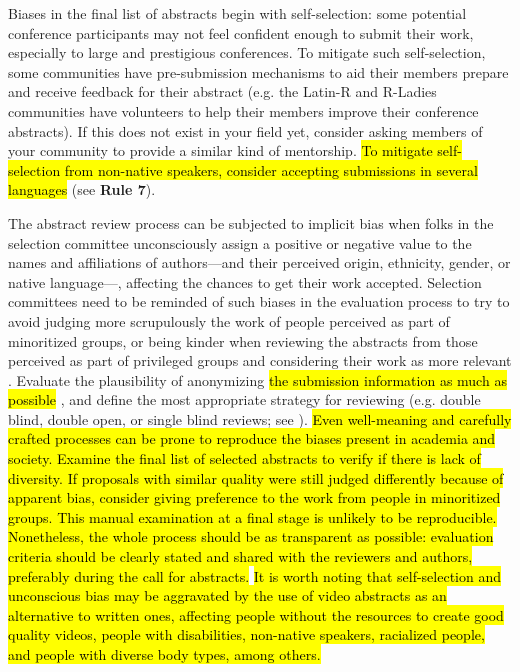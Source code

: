 \documentclass[10pt,letterpaper]{article}
\begin{document}
Biases in the final list of abstracts begin with self-selection: some potential conference participants may not feel confident enough to submit their work, especially to large and prestigious conferences.
To mitigate such self-selection, some communities have pre-submission mechanisms to aid their members prepare and receive feedback for their abstract (e.g. the Latin-R and R-Ladies communities have volunteers to help their members improve their conference abstracts).
If this does not exist in your field yet, consider asking members of your community to provide a similar kind of mentorship.
\hl{To mitigate self-selection from non-native speakers, consider accepting submissions in several languages} (see \textbf{Rule 7}).


The abstract review process can be subjected to implicit bias \cite{ross_everyday_2020} when folks in the selection committee unconsciously assign a positive or negative value to the names and affiliations of authors—and their perceived origin, ethnicity, gender, or native language—, affecting the chances to get their work accepted. 
Selection committees need to be reminded of such biases in the evaluation process to try to avoid judging more scrupulously the work of people perceived as part of minoritized groups, or being kinder when reviewing the abstracts from those perceived as part of privileged groups and considering their work as more relevant \cite{swartzScienceValueDiversity2019, andersson_implicit_2019}.
Evaluate the plausibility of anonymizing \hl{the submission information as much as possible} , and
define the most appropriate strategy for reviewing (e.g. double blind, double open, or single blind reviews; see \cite{numfocus_discover_2021}).
 \hl{Even well-meaning and carefully crafted processes can be prone to reproduce the biases present in academia and society. Examine the final list of selected abstracts to verify if there is lack of diversity. If proposals with similar quality were still judged differently because of apparent bias, consider giving preference to the work from people in minoritized groups.
This manual examination at a final stage is unlikely to be reproducible. Nonetheless, the whole process should be as transparent as possible: evaluation criteria should be clearly stated and shared with the reviewers and authors, preferably during the call for abstracts.} 
\hl{It is worth noting that self-selection and unconscious bias may be aggravated by the use of video abstracts as an alternative to written ones, affecting people without the resources to create good quality videos, people with disabilities, non-native speakers, racialized people, and people with diverse body types, among others.} \cite{spitschanVideoGrantProposals2021}
\end{document}
